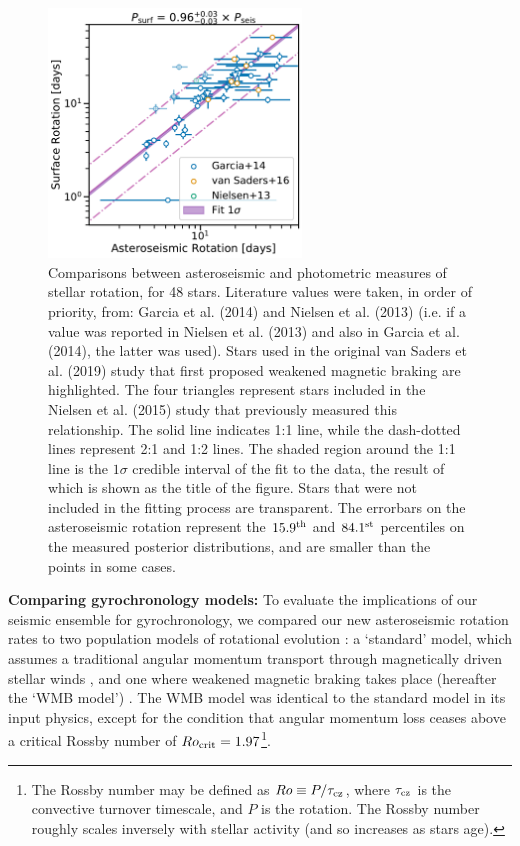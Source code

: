 \documentclass[12pt]{article}
\begin{document}
\begin{figure}[h!]
	\centering
	\includegraphics[width=0.6\textwidth]{Images/surf-seis-comparison_update.pdf}
	\caption{Comparisons between asteroseismic and photometric measures of stellar rotation, for 48 stars. Literature values were taken, in order of priority, from: Garcia et al. (2014) \cite{garcia+2014} and Nielsen et al. (2013) \cite{nielsen+2013} (i.e. if a value was reported in Nielsen et al. (2013) and also in Garcia et al. (2014), the latter was used). Stars used in the original van Saders et al. (2019) \cite{vansaders+2016} study that first proposed weakened magnetic braking are highlighted. The four triangles represent stars included in the Nielsen et al. (2015) study \cite{nielsen+2015} that previously measured this relationship. The solid line indicates 1:1 line, while the dash-dotted lines represent 2:1 and 1:2 lines. The shaded region around the 1:1 line is the $1\sigma$ credible interval of the fit to the data, the result of which is shown as the title of the figure. Stars that were not included in the fitting process are transparent. The errorbars on the asteroseismic rotation represent the $15.9^{\rm th}$ and $84.1^{\rm st}$ percentiles on the measured posterior distributions, and are smaller than the points in some cases.}
	\label{fig:protlit}
\end{figure}

\textbf{Comparing gyrochronology models:} To evaluate the implications of our seismic ensemble for gyrochronology, we compared our new asteroseismic rotation rates to two population models of rotational evolution \cite{vansaders+2019}: a `standard' model, which assumes a traditional angular momentum transport through magnetically driven stellar winds \cite{vansaders+2016,skumanich1972, kawaler1988}, and one where weakened magnetic braking takes place (hereafter the `WMB model') \cite{vansaders+2016}.  The WMB model was identical to the standard model in its input physics, except for the condition that angular momentum loss ceases above a critical Rossby number of $Ro_{\rm crit} = 1.97$\footnote{The Rossby number may be defined as $Ro \equiv P/\tau_{\rm cz}$, where $\tau_{\rm cz}$ is the convective turnover timescale, and $P$ is the rotation. The Rossby number roughly scales inversely with stellar activity (and so increases as stars age).}.
\end{document}
